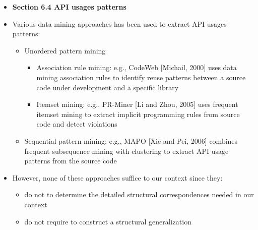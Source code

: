 \documentclass{article}
\newcommand{\bold}{\textbf}
\begin{document}
\begin{itemize} [leftmargin=.1in]
\item \bold{Section 6.4 API usages patterns}
\item Various data mining approaches has been used to extract API usages patterns:
\begin{itemize}
\item Unordered pattern mining
\begin{itemize}
\item Association rule mining: e.g., CodeWeb [Michail, 2000] uses data mining association rules to identify reuse patterns between a source code under development and a specific library
\item Itemset mining: e.g., PR-Miner [Li and Zhou, 2005] uses frequent itemset mining to extract implicit programming rules from source code and detect violations
\end{itemize}
\item Sequential pattern mining: e.g., MAPO [Xie and Pei, 2006] combines frequent subsequence mining with clustering to extract API usage patterns from the source code
\end{itemize}
\item However, none of these approaches suffice to our context since they:
\begin{itemize}
\item do not to determine the detailed structural correspondences needed in our context
\item do not require to construct a structural generalization
\end{itemize}



\end{itemize}
\end{document}
